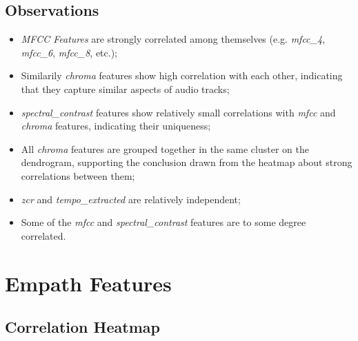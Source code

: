 \subsection*{Observations}
\begin{itemize}
  \item \textit{MFCC Features} are strongly correlated among themselves (e.g.
    \textit{mfcc\_4}, \textit{mfcc\_6}, \textit{mfcc\_8}, etc.);
  \item Similarily \textit{chroma} features show high correlation with each
    other, indicating that they capture similar aspects of audio tracks;
  \item \textit{spectral\_contrast} features show relatively small
    correlations with \textit{mfcc} and  \textit{chroma} features, indicating 
    their uniqueness;
  \item All \textit{chroma} features are grouped together in the same cluster
    on the dendrogram, supporting the conclusion drawn from the heatmap about
    strong correlations between them;
  \item \textit{zcr} and \textit{tempo\_extracted} are relatively independent;
  \item Some of the \textit{mfcc} and \textit{spectral\_contrast} features
    are to some degree correlated.
\end{itemize}



\section{Empath Features}

\subsection*{Correlation Heatmap}
\label{sec:correlationheatmapsspotifyfeatures}

